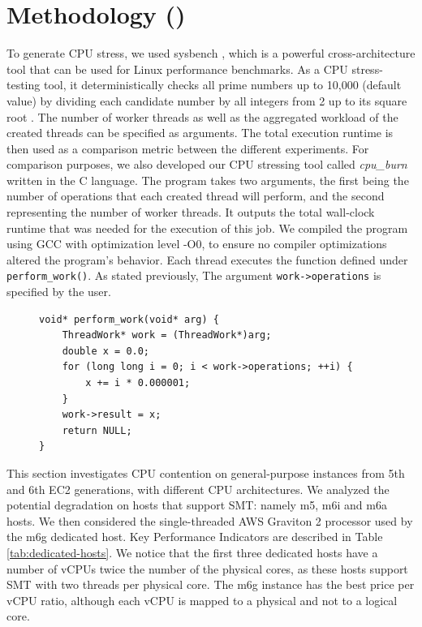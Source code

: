 \section{Methodology (\checkmark)}
To generate CPU stress, we used sysbench \cite{sysbench}, which is a powerful cross-architecture tool
that can be used for Linux performance benchmarks. As a CPU stress-testing tool, it deterministically 
checks all prime numbers up to 10,000 (default value) by dividing each candidate number by all integers 
from 2 up to its square root \cite{gentoo_sysbench}. The number of worker threads 
as well as the aggregated workload of the created threads can be specified as arguments. 
The total execution runtime is then used as a comparison metric 
between the different experiments. For comparison purposes, we also developed our CPU stressing 
tool called \textit{cpu\_burn} written in the C language. The program takes two arguments, the first 
being the number of operations that each created thread will perform, and the second representing 
the number of worker threads. It outputs the total wall-clock runtime that was needed for the 
execution of this job. 
We compiled the program using GCC with optimization level -O0, to ensure no compiler optimizations
altered the program's behavior. Each thread executes the function defined under \texttt{perform\_work()}. 
As stated previously, The argument \texttt{work->operations} is specified by the user.

\begin{figure}[H]
\begin{lstlisting}[caption={Workload of the cpu\_burn tool}]
void* perform_work(void* arg) {
    ThreadWork* work = (ThreadWork*)arg;
    double x = 0.0;
    for (long long i = 0; i < work->operations; ++i) {
        x += i * 0.000001;
    }
    work->result = x;
    return NULL;
}
\end{lstlisting}
\end{figure}
\noindent
This section investigates CPU contention on general-purpose instances from 5th and 6th EC2 generations, 
with different CPU architectures. We analyzed the potential degradation on hosts that support 
\acl{SMT}: namely m5, m6i and m6a hosts. We then considered the single-threaded AWS Graviton 2 
processor used by the m6g dedicated host. Key Performance Indicators are described 
in Table \ref{tab:dedicated-hosts}. We notice that the first three dedicated hosts have a number of vCPUs 
twice the number of the physical cores, as these hosts support \ac{SMT} with 
two threads per physical core. The m6g instance has the best price per vCPU ratio, although each 
vCPU is mapped to a physical and not to a logical core.

